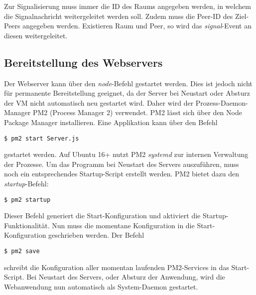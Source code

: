 Zur Signalisierung muss immer die ID des Raums angegeben werden, in welchem die Signalnachricht weitergeleitet werden soll. Zudem muss die Peer-ID des Ziel-Peers angegeben werden. Existieren Raum und Peer, so wird das \textit{signal}-Event an diesen weitergeleitet.

\subsection{Bereitstellung des Webservers}
Der Webserver kann über den \textit{node}-Befehl gestartet werden. Dies ist jedoch nicht für permanente Bereitstellung geeignet, da der Server bei Neustart oder Absturz der \acs{VM} nicht automatisch neu gestartet wird. Daher wird der Prozess-Daemon-Manager \glqq{}PM2\grqq{} (Process Manager 2) verwendet. PM2 lässt sich über den Node Package Manager installieren. Eine Applikation kann über den Befehl
\lstset{style=STYLE_COMMAND_LINE_ARGUMENT_SINGLE_LINE}
\begin{lstlisting}[belowskip=-0.8 \baselineskip]
$ pm2 start Server.js
\end{lstlisting}
gestartet werden. Auf Ubuntu 16+ nutzt PM2 \textit{systemd} zur internen Verwaltung der Prozesse. Um das Programm bei Neustart des Servers auszuführen, muss noch ein entsprechendes \glqq{}Startup-Script\grqq{} erstellt werden. PM2 bietet dazu den \textit{startup}-Befehl:
\lstset{style=STYLE_COMMAND_LINE_ARGUMENT_SINGLE_LINE}
\begin{lstlisting}[belowskip=-0.8 \baselineskip]
$ pm2 startup
\end{lstlisting}
Dieser Befehl generiert die Start-Konfiguration und aktiviert die Startup-Funktionalität. Nun muss die momentane Konfiguration in die Start-Konfiguration geschrieben werden. Der Befehl 
\lstset{style=STYLE_COMMAND_LINE_ARGUMENT_SINGLE_LINE}
\begin{lstlisting}[belowskip=-0.8 \baselineskip]
$ pm2 save
\end{lstlisting}
schreibt die Konfiguration aller momentan laufenden PM2-Services in das Start-Script. Bei Neustart des Servers, oder Absturz der Anwendung, wird die Webanwendung nun automatisch als System-Daemon gestartet.